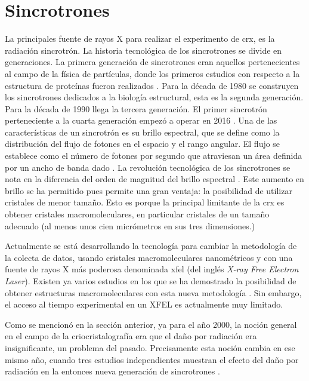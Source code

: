 \section{Sincrotrones}
La principales fuente de rayos X para realizar el experimento de \acrshort{crx}, es la radiación sincrotrón.
La historia tecnológica de los sincrotrones se divide en generaciones. La primera generación de sincrotrones eran aquellos pertenecientes al campo de la física de partículas, donde los primeros estudios con respecto a la estructura de proteínas fueron realizados . Para la década de 1980 se construyen los sincrotrones dedicados a la biología estructural, esta es la segunda generación. Para la década de 1990 llega la tercera generación. El primer sincrotrón perteneciente a la cuarta generación empezó a operar en 2016 . 
Una de las características de un sincrotrón es su brillo espectral, que se define como la distribución del flujo de fotones en el espacio y el rango angular. El flujo se establece como el número de fotones por segundo que atraviesan un área definida por un ancho de banda dado . La revolución tecnológica de los sincrotrones se nota en la diferencia del orden de magnitud del brillo espectral \cite{Willmott2019}. Este aumento en brillo se ha permitido pues permite una gran ventaja: la posibilidad de utilizar cristales de menor tamaño. Esto es porque la principal limitante de la \acrshort{crx} es obtener cristales macromoleculares, en particular cristales de un tamaño adecuado (al menos unos cien micrómetros en sus tres dimensiones.) 

Actualmente se está desarrollando la tecnología para cambiar la metodología de la colecta de datos, usando cristales macromoleculares nanométricos y con una fuente de rayos X más poderosa denominada \acrshort{xfel} (del inglés \emph{X-ray Free Electron Laser}). Existen ya varios estudios en los que se ha demostrado la posibilidad de obtener estructuras macromoleculares con esta nueva metodología . Sin embargo, el acceso al tiempo experimental en un XFEL es actualmente muy limitado.

Como se mencionó en la sección anterior, ya para el año 2000, la noción general en el campo de la criocristalografía era que el daño por radiación era insignificante, un problema del pasado. Precisamente esta noción cambia en ese mismo año, cuando tres estudios independientes muestran el efecto del daño por radiación en la entonces nueva generación de sincrotrones . 

